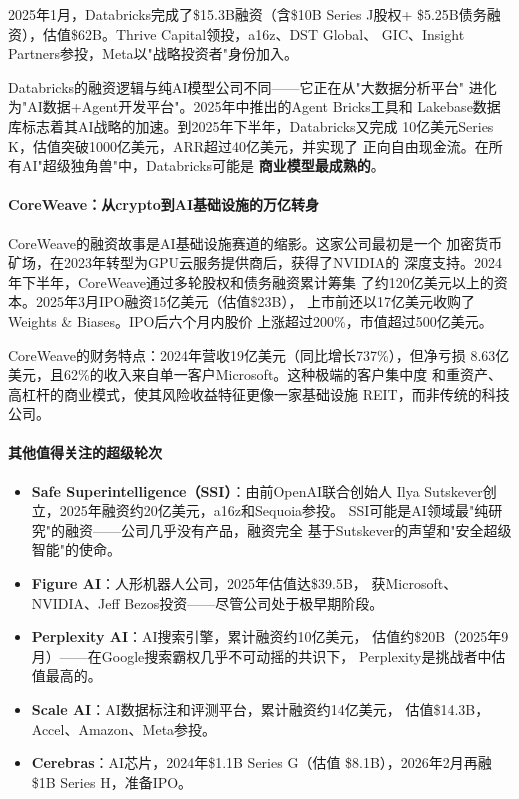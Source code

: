 2025年1月，Databricks完成了\$15.3B融资（含\$10B Series J股权+
\$5.25B债务融资），估值\$62B。Thrive Capital领投，a16z、DST Global、
GIC、Insight Partners参投，Meta以"战略投资者"身份加入。

Databricks的融资逻辑与纯AI模型公司不同——它正在从"大数据分析平台"
进化为"AI数据+Agent开发平台"。2025年中推出的Agent Bricks工具和
Lakebase数据库标志着其AI战略的加速。到2025年下半年，Databricks又完成
10亿美元Series K，估值突破1000亿美元，ARR超过40亿美元，并实现了
正向自由现金流。在所有AI"超级独角兽"中，Databricks可能是
\textbf{商业模型最成熟的}。

\paragraph{CoreWeave：从crypto到AI基础设施的万亿转身}

CoreWeave的融资故事是AI基础设施赛道的缩影。这家公司最初是一个
加密货币矿场，在2023年转型为GPU云服务提供商后，获得了NVIDIA的
深度支持。2024年下半年，CoreWeave通过多轮股权和债务融资累计筹集
了约120亿美元以上的资本。2025年3月IPO融资15亿美元（估值\$23B），
上市前还以17亿美元收购了Weights \& Biases。IPO后六个月内股价
上涨超过200\%，市值超过500亿美元。

CoreWeave的财务特点：2024年营收19亿美元（同比增长737\%），但净亏损
8.63亿美元，且62\%的收入来自单一客户Microsoft。这种极端的客户集中度
和重资产、高杠杆的商业模式，使其风险收益特征更像一家基础设施
REIT，而非传统的科技公司。

\paragraph{其他值得关注的超级轮次}

\begin{itemize}
  \item \textbf{Safe Superintelligence（SSI）}：由前OpenAI联合创始人
    Ilya Sutskever创立，2025年融资约20亿美元，a16z和Sequoia参投。
    SSI可能是AI领域最"纯研究"的融资——公司几乎没有产品，融资完全
    基于Sutskever的声望和"安全超级智能"的使命。
  \item \textbf{Figure AI}：人形机器人公司，2025年估值达\$39.5B，
    获Microsoft、NVIDIA、Jeff Bezos投资——尽管公司处于极早期阶段。
  \item \textbf{Perplexity AI}：AI搜索引擎，累计融资约10亿美元，
    估值约\$20B（2025年9月）——在Google搜索霸权几乎不可动摇的共识下，
    Perplexity是挑战者中估值最高的。
  \item \textbf{Scale AI}：AI数据标注和评测平台，累计融资约14亿美元，
    估值\$14.3B，Accel、Amazon、Meta参投。
  \item \textbf{Cerebras}：AI芯片，2024年\$1.1B Series G（估值
    \$8.1B），2026年2月再融\$1B Series H，准备IPO。
\end{itemize}

